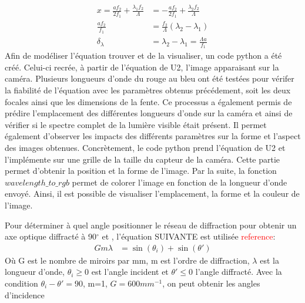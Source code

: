 \documentclass[conference]{IEEEtran}
\begin{document}
\begin{align*}
    x=\frac{a f_2}{2f_1}+\frac{\lambda_1 f_2}{\Lambda}&=-\frac{a f_2}{2f_1}+\frac{\lambda_2 f_2}{\Lambda}\\
    \frac{af_2}{f_1}&=\frac{f_2}{\Lambda}(\lambda_2-\lambda_1)\\
    \delta_{\lambda}&=\lambda_2-\lambda_1=\frac{\Lambda a}{f_1}
\end{align*}
Afin de modéliser l'équation trouver et de la visualiser, un code python a été créé. Celui-ci recrée, à partir de l'équation
de U2, l'image apparaisant sur la caméra. Plusieurs longueurs d'onde du rouge au bleu ont été testées pour vérifer 
la fiabilité de l'équation avec les paramètres obtenus précédement, soit les deux focales ainsi que les dimensions de la fente. 
Ce processus a également permis de prédire l'emplacement des différentes longueurs d'onde sur la caméra 
et ainsi de vérifier si le spectre complet de la lumière visible était présent. Il permet également d'observer les
impacts des différents paramètres sur la forme et l'aspect des images obtenues. Concrètement, le code python prend 
l'équation de U2 et l'implémente sur une grille de la taille du capteur de la caméra. Cette partie permet d'obtenir 
la position et la forme de l'image. Par la suite, la fonction $wavelength\_to\_rgb$ permet de colorer l'image en fonction
de la longueur d'onde envoyé. Ainsi, il est possible de visualiser l'emplacement, la forme et la couleur de l'image.    

Pour déterminer à quel angle positionner le réseau de diffraction pour 
obtenir un axe optique diffracté à 90$^{\circ}$ et , l'équation SUIVANTE est utilisée \textcolor{red}{reference}:
\begin{align}
    G m \lambda &= \sin(\theta_i) + \sin(\theta')
\end{align}
Où G est le nombre de miroirs par mm, m est l'ordre de diffraction, $\lambda$ est la longueur d'onde,
$\theta_i \ge 0$ est l'angle incident et $\theta' \le 0$ l'angle diffracté. Avec la condition 
$\theta_i-\theta'=90$, m=1, $G=600mm^{-1}$, on peut obtenir les angles d'incidence 
\end{document}
